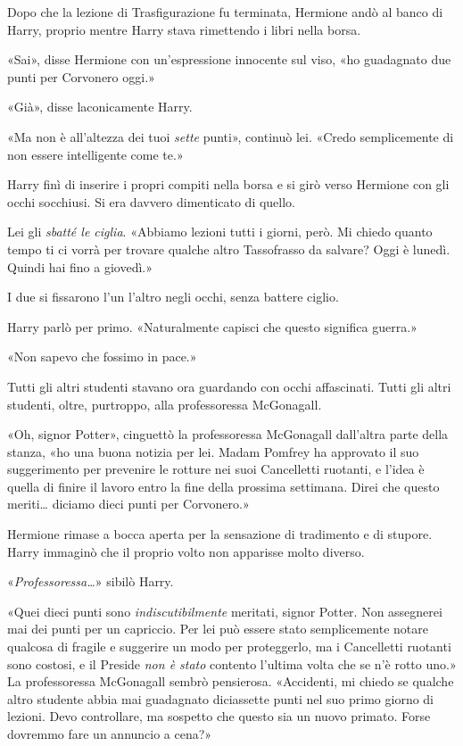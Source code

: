 Dopo che la lezione di Trasfigurazione fu terminata, Hermione andò al banco di Harry, proprio mentre Harry stava rimettendo i libri nella borsa.

«Sai», disse Hermione con un’espressione innocente sul viso, «ho guadagnato due punti per Corvonero oggi.»

«Già», disse laconicamente Harry.

«Ma non è all’altezza dei tuoi \textit{sette} punti», continuò lei. «Credo semplicemente di non essere intelligente come te.»

Harry finì di inserire i propri compiti nella borsa e si girò verso Hermione con gli occhi socchiusi. Si era davvero dimenticato di quello.

Lei gli \textit{sbatté le ciglia}. «Abbiamo lezioni tutti i giorni, però. Mi chiedo quanto tempo ti ci vorrà per trovare qualche altro Tassofrasso da salvare? Oggi è lunedì. Quindi hai fino a giovedì.»

I due si fissarono l’un l’altro negli occhi, senza battere ciglio.

Harry parlò per primo. «Naturalmente capisci che questo significa guerra.»

«Non sapevo che fossimo in pace.»

Tutti gli altri studenti stavano ora guardando con occhi affascinati. Tutti gli altri studenti, oltre, purtroppo, alla professoressa McGonagall.

«Oh, signor Potter», cinguettò la professoressa McGonagall dall’altra parte della stanza, «ho una buona notizia per lei. Madam Pomfrey ha approvato il suo suggerimento per prevenire le rotture nei suoi Cancelletti ruotanti, e l’idea è quella di finire il lavoro entro la fine della prossima settimana. Direi che questo meriti… diciamo dieci punti per Corvonero.»

Hermione rimase a bocca aperta per la sensazione di tradimento e di stupore. Harry immaginò che il proprio volto non apparisse molto diverso.

«\textit{Professoressa…}» sibilò Harry.

«Quei dieci punti sono \textit{indiscutibilmente} meritati, signor Potter. Non assegnerei mai dei punti per un capriccio. Per lei può essere stato semplicemente notare qualcosa di fragile e suggerire un modo per proteggerlo, ma i Cancelletti ruotanti sono costosi, e il Preside \textit{non è stato} contento l’ultima volta che se n’è rotto uno.» La professoressa McGonagall sembrò pensierosa. «Accidenti, mi chiedo se qualche altro studente abbia mai guadagnato diciassette punti nel suo primo giorno di lezioni. Devo controllare, ma sospetto che questo sia un nuovo primato. Forse dovremmo fare un annuncio a cena?»

